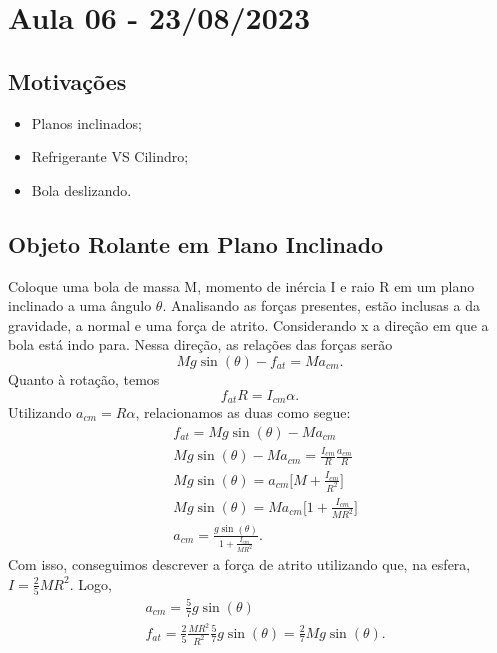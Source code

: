 \documentclass[physicsII_notes.tex]{subfiles}
\begin{document}
\section{Aula 06 - 23/08/2023}
\subsection{Motivações}
\begin{itemize}
	\item Planos inclinados;
	\item Refrigerante VS Cilindro;
	\item Bola deslizando.
\end{itemize}
\subsection{Objeto Rolante em Plano Inclinado}
Coloque uma bola de massa M, momento de inércia I e raio R em um plano inclinado a uma ângulo \(\theta \).
Analisando as forças presentes, estão inclusas a da gravidade, a normal e uma força de atrito. Considerando x a direção em que a bola
está indo para. Nessa direção, as relações das forças serão
\[
	Mg\sin{(\theta )} - f_{at} = Ma_{cm}.
\]
Quanto à rotação, temos
\[
	f_{at}R = I_{cm}\alpha.
\]
Utilizando \(a_{cm} = R\alpha \), relacionamos as duas como segue:
\begin{align*}
	 & f_{at} = Mg\sin{(\theta )} - Ma_{cm}                               \\
	 & Mg\sin{(\theta )} - Ma_{cm} = \frac{I_{cm}}{R}\frac{a_{cm}}{R}     \\
	 & Mg\sin{(\theta )} = a_{cm}\biggl[M + \frac{I_{cm}}{R^{2}}\biggr]   \\
	 & Mg\sin{(\theta )} = Ma_{cm}\biggl[1 + \frac{I_{cm}}{MR^{2}}\biggr] \\
	 & a_{cm} = \frac{g\sin{(\theta )}}{1 + \frac{I_{cm}}{MR^{2}}}.
\end{align*}
Com isso, conseguimos descrever a força de atrito utilizando que, na esfera, \(I = \frac{2}{5}MR^{2}\). Logo,
\begin{align*}
	 & a_{cm} = \frac{5}{7}g\sin{(\theta )}                                                                \\
	 & f_{at} = \frac{2}{5}\frac{MR^{2}}{R^{2}}\frac{5}{7}g\sin{(\theta )} = \frac{2}{7}Mg\sin{(\theta )}.
\end{align*}
\end{document}
